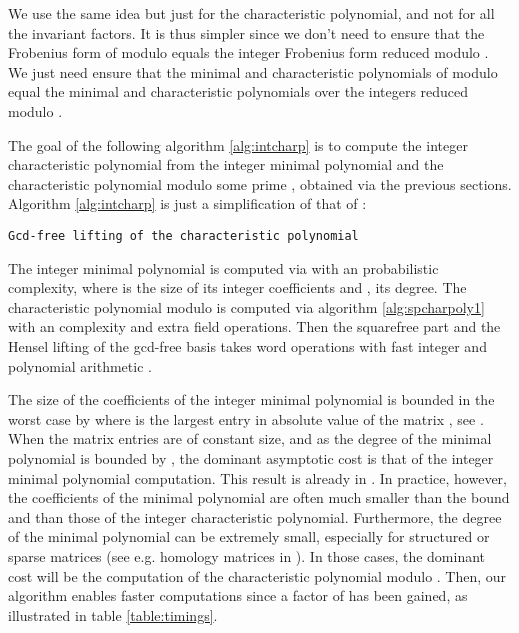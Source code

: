\documentclass{article}
\begin{document}
We use the same idea but just for the characteristic polynomial, and
not for all the invariant factors. It is
thus simpler since we don't need to ensure that the Frobenius form
of  modulo  equals the integer Frobenius form reduced modulo
. We just need ensure that the minimal and characteristic 
polynomials of  modulo
 equal the minimal and characteristic polynomials over the integers
reduced modulo .

The goal of the following algorithm \ref{alg:intcharp}
is to compute the
integer characteristic polynomial from the integer minimal polynomial
and the characteristic polynomial modulo some prime , obtained via
the previous sections. Algorithm \ref{alg:intcharp} is just a
simplification of that of \cite{Storjohann:2000:Frob}:

\begin{algorithm}
  \dontprintsemicolon
  \caption{\texttt{Gcd-free lifting of the characteristic
      polynomial}\label{alg:intcharp}}
\end{algorithm}
The integer minimal polynomial is computed via \cite[Theorem
3.3]{jgd:2001:jsc} with an  probabilistic complexity,
where  is the size of its integer coefficients and , its
degree.
The characteristic polynomial modulo  is computed via algorithm
\ref{alg:spcharpoly1} with an  complexity and
 extra field operations.
Then the squarefree part \cite{Gerhard:2001:sqrfree} and 
the Hensel lifting of the gcd-free basis takes 
word operations with fast integer and  polynomial arithmetic
\cite[Theorem 15.18]{VonzurGathen:1999:MCA}.

The size of the coefficients of the integer minimal polynomial is bounded in the worst case by
 where  is the
largest entry in absolute value of the matrix , see \cite[Lemma 2.1]{jgd:2007:jipam}.
When the matrix entries are of constant size,   and
as the
degree of the minimal polynomial is bounded by , the dominant
asymptotic cost is that of the integer minimal polynomial computation. 
This result is already in \cite{Storjohann:2000:Frob}.
In practice, however, the coefficients of the minimal
polynomial are often much smaller than the bound and than those of the
integer characteristic polynomial. Furthermore, the degree of the
minimal polynomial can be extremely small, especially for structured
or sparse matrices (see e.g. homology matrices
in \cite{jgd:2001:jsc}). In those cases, the dominant cost will 
be the computation of the characteristic polynomial modulo .
Then, our algorithm enables faster computations since a factor of
 has been gained, as illustrated in table \ref{table:timings}.
\end{document}
